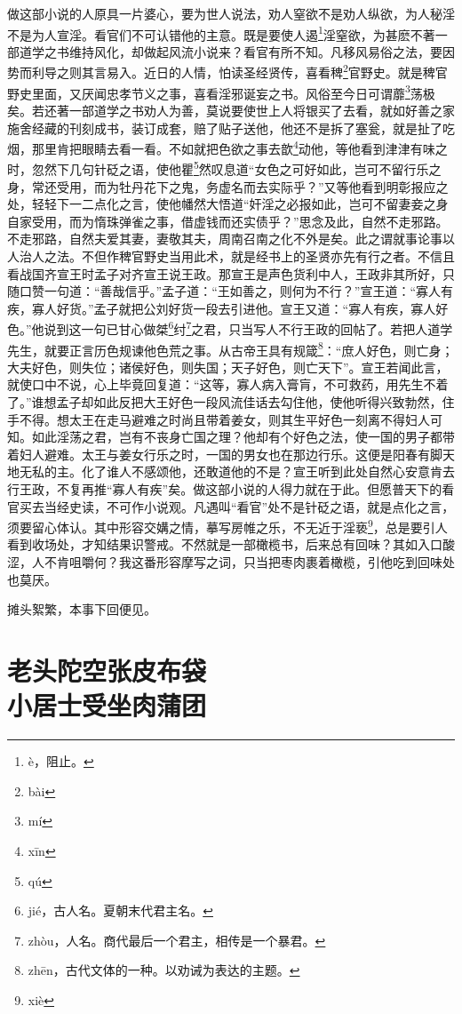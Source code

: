 \documentclass[a4paper,12pt,UTF8,twoside]{ctexbook}
\begin{document}
做这部小说的人原具一片婆心，要为世人说法，劝人窒欲不是劝人纵欲，为人秘淫不是为人宣淫。看官们不可认错他的主意。既是要使人遏\footnote{\`e，阻止。}淫窒欲，为甚麽不著一部道学之书维持风化，却做起风流小说来？看官有所不知。凡移风易俗之法，要因势而利导之则其言易入。近日的人情，怕读圣经贤传，喜看稗\footnote{b\`ai}官野史。就是稗官野史里面，又厌闻忠孝节义之事，喜看淫邪诞妄之书。风俗至今日可谓蘼\footnote{m\'i}荡极矣。若还著一部道学之书劝人为善，莫说要使世上人将银买了去看，就如好善之家施舍经藏的刊刻成书，装订成套，赔了贴子送他，他还不是拆了塞瓮，就是扯了吃烟，那里肯把眼睛去看一看。不如就把色欲之事去歆\footnote{x\=in}动他，等他看到津津有味之时，忽然下几句针砭之语，使他瞿\footnote{q\'u}然叹息道“女色之可好如此，岂可不留行乐之身，常还受用，而为牡丹花下之鬼，务虚名而去实际乎？”又等他看到明彰报应之处，轻轻下一二点化之言，使他幡然大悟道“奸淫之必报如此，岂可不留妻妾之身自家受用，而为惰珠弹雀之事，借虚钱而还实债乎？”思念及此，自然不走邪路。不走邪路，自然夫爱其妻，妻敬其夫，周南召南之化不外是矣。此之谓就事论事以人治人之法。不但作稗官野史当用此术，就是经书上的圣贤亦先有行之者。不信且看战国齐宣王时孟子对齐宣王说王政。那宣王是声色货利中人，王政非其所好，只随口赞一句道：“善哉信乎。”孟子道：“王如善之，则何为不行？”宣王道：“寡人有疾，寡人好货。”孟子就把公刘好货一段去引进他。宣王又道：“寡人有疾，寡人好色。”他说到这一句已甘心做桀\footnote{ji\'e，古人名。夏朝末代君主名。}纣\footnote{zh\`ou，人名。商代最后一个君主，相传是一个暴君。}之君，只当写人不行王政的回帖了。若把人道学先生，就要正言历色规谏他色荒之事。从古帝王具有规箴\footnote{zh\=en，古代文体的一种。以劝诫为表达的主题。}：“庶人好色，则亡身；大夫好色，则失位；诸侯好色，则失国；天子好色，则亡天下”。宣王若闻此言，就使口中不说，心上毕竟回复道：“这等，寡人病入膏肓，不可救药，用先生不着了。”谁想孟子却如此反把大王好色一段风流佳话去勾住他，使他听得兴致勃然，住手不得。想太王在走马避难之时尚且带着姜女，则其生平好色一刻离不得妇人可知。如此淫荡之君，岂有不丧身亡国之理？他却有个好色之法，使一国的男子都带着妇人避难。太王与姜女行乐之时，一国的男女也在那边行乐。这便是阳春有脚天地无私的主。化了谁人不感颂他，还敢道他的不是？宣王听到此处自然心安意肯去行王政，不复再推“寡人有疾”矣。做这部小说的人得力就在于此。但愿普天下的看官买去当经史读，不可作小说观。凡遇叫“看官”处不是针砭之语，就是点化之言，须要留心体认。其中形容交媾之情，摹写房帷之乐，不无近于淫亵\footnote{xi\`e}，总是要引人看到收场处，才知结果识警戒。不然就是一部橄榄书，后来总有回味？其如入口酸涩，人不肯咀嚼何？我这番形容摩写之词，只当把枣肉裹着橄榄，引他吃到回味处也莫厌。

摊头絮繁，本事下回便见。

\chapter[老头陀空张皮布袋\ 小居士受坐肉蒲团]{老头陀空张皮布袋\\小居士受坐肉蒲团}
\end{document}
